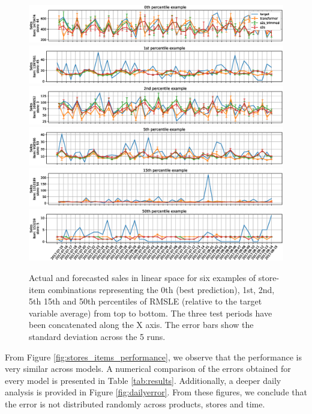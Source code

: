 \documentclass{elsarticle}
\begin{document}
	\begin{figure}
	\centering
	\includegraphics[width=1\linewidth]{img/sample_0_lin}
	\includegraphics[width=1\linewidth]{img/sample_1_lin}
	\includegraphics[width=1\linewidth]{img/sample_2_lin}
	\includegraphics[width=1\linewidth]{img/sample_3_lin}
	\includegraphics[width=1\linewidth]{img/sample_4_lin}
	\includegraphics[width=1\linewidth]{img/sample_5_lin}
	\caption{Actual and forecasted sales in linear space for six examples of store-item combinations representing the 0th (best prediction), 1st, 2nd, 5th 15th and 50th percentiles of RMSLE (relative to the target variable average) from top to bottom. The three test periods have been concatenated along the X axis. The error bars show the standard deviation across the 5 runs.}
	\label{fig:ts_lin}
\end{figure}

From Figure \ref{fig:stores_items_performance}, we observe that the performance is very similar across models. A numerical comparison of the errors obtained for every model is presented in Table \ref{tab:results}. Additionally, a deeper daily analysis is provided in Figure \ref{fig:dailyerror}. From these figures, we conclude that the error is not distributed randomly across products, stores and time. 
\end{document}
